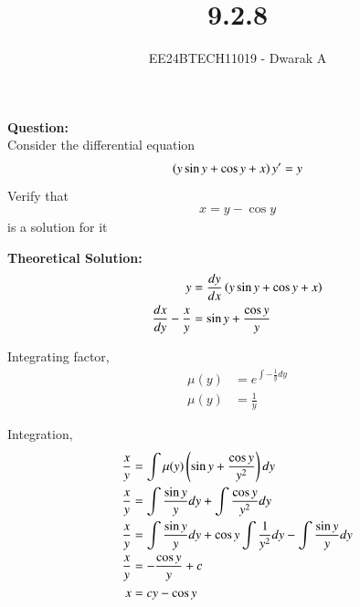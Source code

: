 \documentclass[journal]{IEEEtran}
\begin{document}

\vspace{3cm}

\title{9.2.8}
\author{EE24BTECH11019 - Dwarak A}
{\let\newpage\relax\maketitle}

\renewcommand{\thefigure}{\theenumi}
\renewcommand{\thetable}{\theenumi}
\setlength{\intextsep}{10pt} %


\renewcommand{\thetable}{\theenumi}

\textbf{Question:}\\
Consider the differential equation 
\begin{align}
    \left(y\sin{y}+\cos{y}+x\right)y^\prime=y
    \label{eqn:ode}
\end{align}
    Verify that
\begin{align}
    x=y-\cos{y}
    \label{eqn:soln}
\end{align}
    is a solution for it

\solution

\medskip

\textbf{Theoretical Solution:}
\begin{align}
    y &= \frac{dy}{dx}\left(y\sin{y}+\cos{y}+x\right) \\
    \frac{dx}{dy} - \frac{x}{y} &= \sin{y} + \frac{\cos{y}}{y}
\end{align}

Integrating factor,
\begin{align}
    \mu(y) &= e^{\int-\frac{1}{y}dy} \\
    \mu(y) &= \frac{1}{y}
\end{align}

Integration,
\begin{align}
    \frac{x}{y} &= \int\mu(y)\left(\sin{y}+\frac{\cos{y}}{y^2}\right)dy \\
    \frac{x}{y} &= \int\frac{\sin{y}}{y}dy+\int\frac{\cos{y}}{y^2}dy \\
    \frac{x}{y} &= \int\frac{\sin{y}}{y}dy+\cos{y}\int\frac{1}{y^2}dy-\int\frac{\sin{y}}{y}dy \\
    \frac{x}{y} &= -\frac{\cos{y}}{y}+c \\
    x &= cy-\cos{y}
    \label{eqn:gen_soln}
\end{align}
\end{document}
